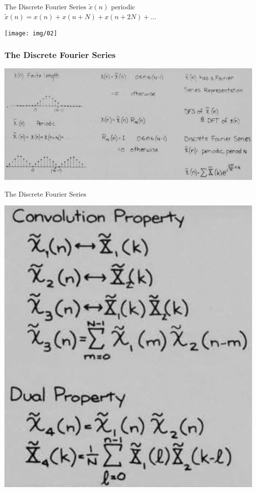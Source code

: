 \documentclass[pdflatex,compress,mathserif]{beamer}
\begin{document}
\begin{frame}{The Discrete Fourier Series}
	$ \tilde{x}(n) $ periodic\\
	$ \tilde{x}(n) = x(n) + x(n+N) + x(n+2N) + \dots $
	\begin{center}
		\texttt{[image: img/02]}
	\end{center}
\end{frame}

\begin{frame}
	\frametitle{The Discrete Fourier Series}
	\begin{center}
		\includegraphics[width=\linewidth]{img/img01}
	\end{center}
\end{frame}

\begin{frame}{The Discrete Fourier Series}
	\begin{center}
		\includegraphics[width=0.5\linewidth]{img/img03}
	\end{center}
\end{frame}
\end{document}
